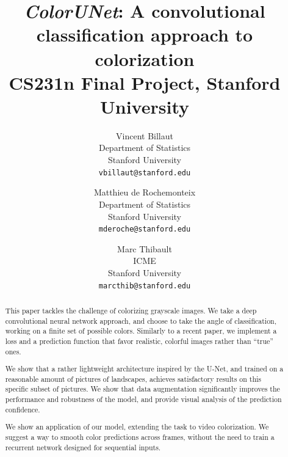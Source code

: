 \documentclass[10pt,twocolumn,letterpaper]{article}
\begin{document}
\title{\textit{ColorUNet}: A convolutional classification approach to colorization \\[.2in] \normalsize CS231n Final Project, Stanford University}

\author{Vincent Billaut\\
Department of Statistics\\
Stanford University\\
{\tt\small vbillaut@stanford.edu}
\and
Matthieu de Rochemonteix\\
Department of Statistics\\
Stanford University\\
{\tt\small mderoche@stanford.edu}
\and
Marc Thibault\\
ICME\\
Stanford University\\
{\tt\small marcthib@stanford.edu}
}

\maketitle



\begin{abstract}
This paper tackles the challenge of colorizing grayscale images. We take a deep convolutional neural network approach, and choose to take the angle of classification, working on a finite set of possible colors. Similarly to a recent paper, we implement a loss and a prediction function that favor realistic, colorful images rather than ``true'' ones.

We show that a rather lightweight architecture inspired by the U-Net, and trained on a reasonable amount of pictures of landscapes, achieves satisfactory results on this specific subset of pictures. We show that data augmentation significantly improves the performance and robustness of the model, and provide visual analysis of the prediction confidence. 

We show an application of our model, extending the task to video colorization. We suggest a way to smooth color predictions across frames, without the need to train a recurrent network designed for sequential inputs.

\end{abstract}
\end{document}
